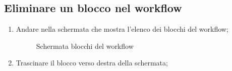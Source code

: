 \subsection{Eliminare un blocco nel workflow}
\begin{enumerate}
	\item Andare nella schermata che mostra l'elenco dei blocchi del workflow;
	\begin{figure}[!ht]
		\centering
		\caption{Schermata blocchi del workflow}
	\end{figure}
	\newpage
	\item Trascinare il blocco verso destra della schermata;
	\begin{figure}[!ht]

\end{figure}
\end{enumerate}
